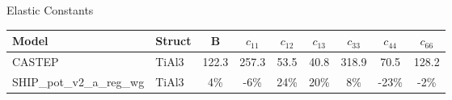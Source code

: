 \documentclass[preview]{standalone}
\begin{document}
\begin{center}
\textnormal{Elastic Constants} \\
\vspace{2mm}
\begin{tabular}{ l l c c c c c c c } \toprule 
Model & Struct & B & $c_{11}$ & $c_{12}$ & $c_{13}$ & $c_{33}$ & $c_{44}$ & $c_{66}$\\ \midrule 
CASTEP & TiAl3 & 122.3 & 257.3 & 53.5 & 40.8 & 318.9 & 70.5 & 128.2\\ 
SHIP\_pot\_v2\_a\_reg\_wg & TiAl3 & 4\% & -6\% & 24\% & 20\% & 8\% & -23\% & -2\%\\ 
\end{tabular} \bigskip 
\end{center}
\end{document}
